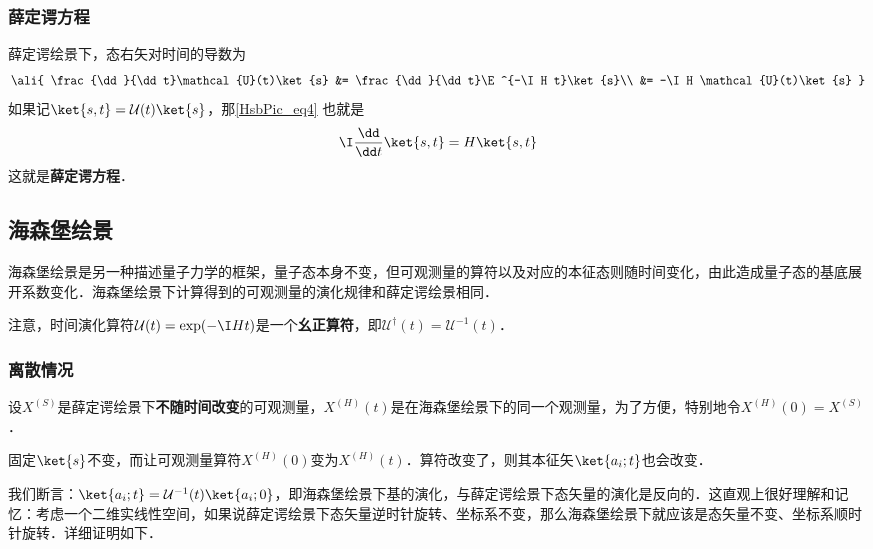 \subsubsection{薛定谔方程}

薛定谔绘景下，态右矢对时间的导数为
\begin{equation}\label{HsbPic_eq4}
\ali{
    \frac{\dd}{\dd t}\mathcal{U}(t)\ket{s} &= \frac{\dd}{\dd t}\E^{-\I H t}\ket{s}\\
    &= -\I H \mathcal{U}(t)\ket{s}
}
\end{equation}
如果记$\ket{s, t}=\mathcal{U}(t)\ket{s}$，那\autoref{HsbPic_eq4} 也就是
\begin{equation}\label{HsbPic_eq5}
\I \frac{\dd}{\dd t}\ket{s, t} = H\ket{s, t}
\end{equation}
这就是\textbf{薛定谔方程}．








\subsection{海森堡绘景}

海森堡绘景是另一种描述量子力学的框架，量子态本身不变，但可观测量的算符以及对应的本征态则随时间变化，由此造成量子态的基底展开系数变化．海森堡绘景下计算得到的可观测量的演化规律和薛定谔绘景相同．

注意，时间演化算符$\mathcal{U}(t)=\exp(-\I Ht)$是一个\textbf{幺正算符}，即$\mathcal{U}^\dagger(t)=\mathcal{U}^{-1}(t)$．

\subsubsection{离散情况}



设$X^{(S)}$是薛定谔绘景下\textbf{不随时间改变}的可观测量，$X^{(H)}(t)$是在海森堡绘景下的同一个观测量，为了方便，特别地令$X^{(H)}(0)=X^{(S)}$．


固定$\ket{s}$不变，而让可观测量算符$X^{(H)}(0)$变为$X^{(H)}(t)$．算符改变了，则其本征矢$\ket{a_i; t}$也会改变．

我们断言：$\ket{a_i; t}=\mathcal{U}^{-1}(t)\ket{a_i; 0}$，即海森堡绘景下基的演化，与薛定谔绘景下态矢量的演化是反向的．这直观上很好理解和记忆：考虑一个二维实线性空间，如果说薛定谔绘景下态矢量逆时针旋转、坐标系不变，那么海森堡绘景下就应该是态矢量不变、坐标系顺时针旋转．详细证明如下．

